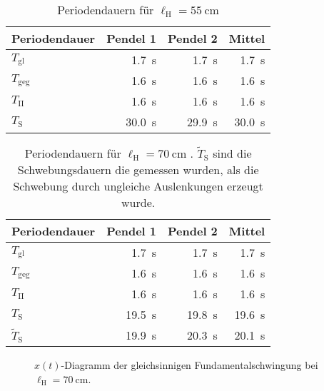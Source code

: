 \documentclass[12pt,a4paper]{scrartcl}
\newcommand{\lh}{\ell_{\mathrm{H}}}
\begin{document}
\begin{table}[H]
		\caption{Periodendauern für \(\lh = \qty{55}{\centi\meter}\) \label{tbl:res55}}
	\begin{tabular*}{\textwidth}{@{\extracolsep{\fill}}@{\hspace{5pt}}lrrr@{\hspace{5pt}}}
		\toprule
		Periodendauer & Pendel 1 & Pendel 2 & Mittel\\
		\midrule
		\(T_{\text{gl}}\) & \qty{1,7}{\second} & \qty{1,7}{\second} & \qty{1,7}{\second}\\
		\(T_{\text{geg}}\) & \qty{1,6}{\second} & \qty{1,6}{\second} & \qty{1,6}{\second}\\
		\(T_{\text{II}}\) & \qty{1,6}{\second} & \qty{1,6}{\second} & \qty{1,6}{\second}\\
		\(T_{\text{S}}\) & \qty{30,0}{\second} & \qty{29,9}{\second} & \qty{30,0}{\second} \\
		\bottomrule
	\end{tabular*}
\end{table}

\begin{table}[H]
		\caption{Periodendauern für \(\lh = \qty{70}{\centi\meter}\) \label{tbl:res70}. \(\tilde{T}_{\text{S}}\) sind die Schwebungsdauern die gemessen wurden, als die Schwebung durch ungleiche Auslenkungen erzeugt wurde.}
	\begin{tabular*}{\textwidth}{@{\extracolsep{\fill}}@{\hspace{5pt}}lrrr@{\hspace{5pt}}}
		\toprule
		Periodendauer & Pendel 1 & Pendel 2 & Mittel\\
		\midrule
		\(T_{\text{gl}}\) & \qty{1,7}{\second} & \qty{1,7}{\second} & \qty{1,7}{\second}\\
		\(T_{\text{geg}}\) & \qty{1,6}{\second} & \qty{1,6}{\second} & \qty{1,6}{\second}\\
		\(T_{\text{II}}\) & \qty{1,6}{\second} & \qty{1,6}{\second} & \qty{1,6}{\second}\\
		\(T_{\text{S}}\) & \qty{19,5}{\second} & \qty{19,8}{\second} & \qty{19,6}{\second} \\
		\(\tilde{T}_{\text{S}}\) & \qty{19,9}{\second} & \qty{20,3}{\second} & \qty{20,1}{\second}\\
		\bottomrule
	\end{tabular*}
\end{table}


\begin{figure}[H]
	\caption{\(x(t)\)-Diagramm der gleichsinnigen Fundamentalschwingung bei \(\lh = \qty{70}{\centi\meter}\).}
	\label{fig:gl70}
\end{figure}
\end{document}
